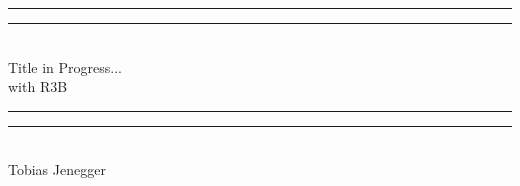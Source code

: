 \documentclass[12pt,twoside]{article}
\begin{document}
{%
  \centering %
  \vspace*{\baselineskip} %
  
  \rule{\textwidth}{1.6pt}\vspace*{-\baselineskip}\vspace*{2pt} 
  \rule{\textwidth}{0.4pt}\\[\baselineskip]
  

	{\Large Title in Progress...  \\[0.3\baselineskip] with R3B    \\[0.3\baselineskip]
	}

  \rule{\textwidth}{0.4pt}\vspace*{-\baselineskip}\vspace{3.2pt}
  \rule{\textwidth}{2pt}\\[\baselineskip] %
  
  
  {\Huge Tobias Jenegger }
  
  \vspace*{2\baselineskip} %
  
  
  \vspace*{\fill}
  
  
  
}
\end{document}
